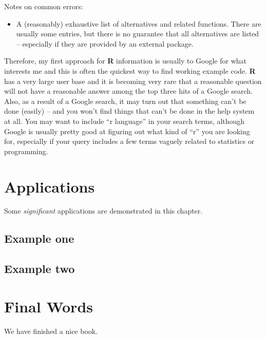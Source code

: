 \documentclass[
]{book}
\providecommand{\tightlist}{%
  \setlength{\itemsep}{0pt}\setlength{\parskip}{0pt}}
\begin{document}
Notes on common errors:

\begin{itemize}
\tightlist
\item
  A (reasonably) exhaustive list of alternatives and related functions. There are usually some entries, but there is no guarantee that all alternatives are listed -- especially if they are provided by an external package.
\end{itemize}

Therefore, my first approach for \textbf{R} information is usually to Google for what interests me and this is often the quickest way to find working example code. \textbf{R} has a very large user base and it is becoming very rare that a reasonable question will not have a reasonable answer among the top three hits of a Google search. Also, as a result of a Google search, it may turn out that something can't be done (easily) -- and you won't find things that can't be done in the help system at all. You may want to include ``r language'' in your search terms, although Google is usually pretty good at figuring out what kind of ``r'' you are looking for, especially if your query includes a few terms vaguely related to statistics or programming.

\hypertarget{applications}{%
\chapter{Applications}\label{applications}}

Some \emph{significant} applications are demonstrated in this chapter.

\hypertarget{example-one}{%
\section{Example one}\label{example-one}}

\hypertarget{example-two}{%
\section{Example two}\label{example-two}}

\hypertarget{final-words}{%
\chapter{Final Words}\label{final-words}}

We have finished a nice book.

  
\end{document}
